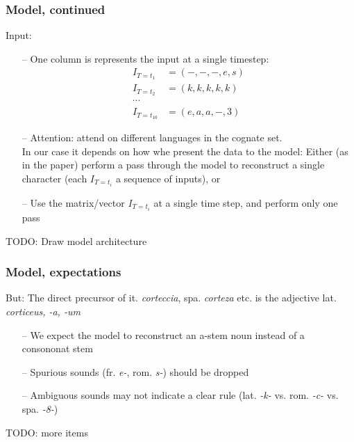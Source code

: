 \documentclass[10pt]{beamer}
\begin{document}
\begin{frame}
    \frametitle{Model, continued}
    Input:
    \begin{itemize}
        \item[--] One column is represents the input at a single timestep: 
        \begin{align*}
            I_{T=t_{1}} &= (-,-,-,e,s) \\
            I_{T=t_{2}} &= (k,k,k,k,k) \\
            \cdots \\
            I_{T=t_{10}} &= (e,a,a,-,3)
        \end{align*} 
        \item[--] Attention: \cite{meloni_ab_2019} attend on different languages in the cognate set. \\
        In our case it depends on how whe present the data to the model:
        Either (as in the paper) perform a pass through the model to reconstruct a single character (each $I_{T=t_{i}}$ a sequence of inputs), or 
        \item[--] Use the matrix/vector $I_{T=t_{i}}$ at a single time step, and perform only one pass
    \end{itemize}
    TODO: Draw model architecture
\end{frame}

\begin{frame}
    \frametitle{Model, expectations}
    But: The direct precursor of it. \textit{corteccia}, spa. \textit{corteza} etc. is the adjective lat. \textit{corticeus, -a, -um}
    \begin{itemize}
        \item[--] We expect the model to reconstruct an a-stem noun instead of a consononat stem
        \item[--] Spurious sounds (fr. \textit{e-}, rom. \textit{s-}) should be dropped
        \item[--] Ambiguous sounds may not indicate a clear rule (lat. \textit{-k-} vs. rom. \textit{-c-} vs. spa. \textit{-8-})  
    \end{itemize}
    TODO: more items
\end{frame}
\end{document}
